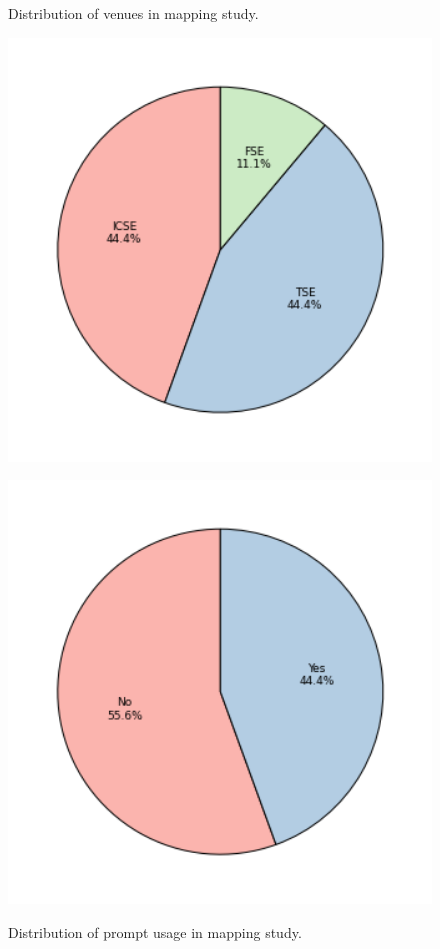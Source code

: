 \documentclass[a4paper]{article}
\begin{document}
\begin{figure}[h]
	\hfill
	\begin{minipage}{0.45\textwidth}
		\caption{Distribution of venues in mapping study.}
		\includegraphics[width=1\textwidth]{figures/Venues.png}
		\label{fig:Venues}
	\end{minipage}
	\hfill
	\begin{minipage}{0.45\textwidth}
		\caption{Distribution of prompt usage in mapping study.}
		\includegraphics[width=1\textwidth]{figures/Prompts.png}
		\label{fig:Prompts}
	\end{minipage}
	\hfill
\end{figure}
\end{document}

